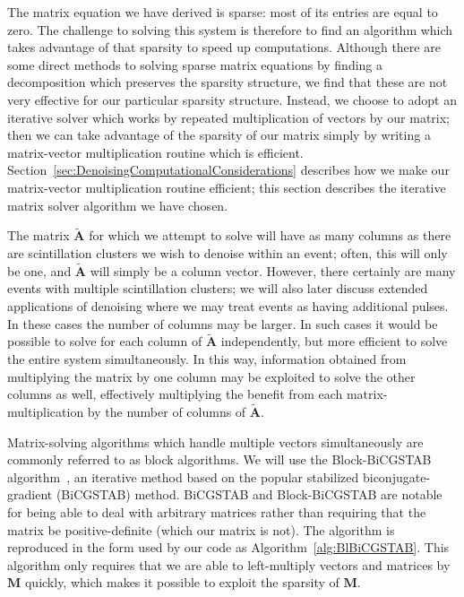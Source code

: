 The matrix equation we have derived is sparse: most of its entries are equal to zero.  The challenge to solving this system is therefore to find an algorithm which takes advantage of that sparsity to speed up computations.  Although there are some direct methods to solving sparse matrix equations by finding a decomposition which preserves the sparsity structure, we find that these are not very effective for our particular sparsity structure.  Instead, we choose to adopt an iterative solver which works by repeated multiplication of vectors by our matrix; then we can take advantage of the sparsity of our matrix simply by writing a matrix-vector multiplication routine which is efficient.  Section~\ref{sec:DenoisingComputationalConsiderations} describes how we make our matrix-vector multiplication routine efficient; this section describes the iterative matrix solver algorithm we have chosen.

The matrix $\mathbf{\widetilde{A}}$ for which we attempt to solve will have as many columns as there are scintillation clusters we wish to denoise within an event; often, this will only be one, and $\mathbf{\widetilde{A}}$ will simply be a column vector.  However, there certainly are many events with multiple scintillation clusters; we will also later discuss extended applications of denoising where we may treat events as having additional pulses.  In these cases the number of columns may be larger.  In such cases it would be possible to solve for each column of $\mathbf{\widetilde{A}}$ independently, but more efficient to solve the entire system simultaneously.  In this way, information obtained from multiplying the matrix by one column may be exploited to solve the other columns as well, effectively multiplying the benefit from each matrix-multiplication by the number of columns of $\mathbf{\widetilde{A}}$.

Matrix-solving algorithms which handle multiple vectors simultaneously are commonly referred to as block algorithms.  We will use the Block-BiCGSTAB algorithm~\cite{BlBiCGSTAB}, an iterative method based on the popular stabilized biconjugate-gradient (BiCGSTAB) method.  BiCGSTAB and Block-BiCGSTAB are notable for being able to deal with arbitrary matrices rather than requiring that the matrix be positive-definite (which our matrix is not).  The algorithm is reproduced in the form used by our code as Algorithm~\ref{alg:BlBiCGSTAB}.  This algorithm only requires that we are able to left-multiply vectors and matrices by $\mathbf{M}$ quickly, which makes it possible to exploit the sparsity of $\mathbf{M}$.

